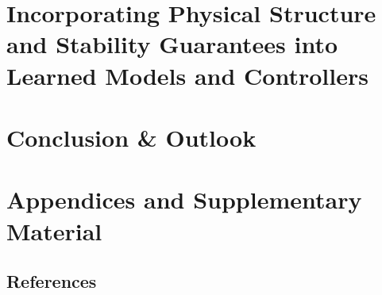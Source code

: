 \documentclass{dissertation}
\begin{document}
\part{Incorporating Physical Structure and Stability Guarantees into Learned Models and Controllers}\label{part:learning}







\part{Conclusion \& Outlook}


\part{Appendices and Supplementary Material}
\appendix





\thumbfalse

\chapter*{References}


% 
% 
% 




\printabbreviations[title={Abbreviations}]

% 


\end{document}
